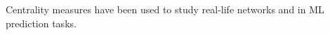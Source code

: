 \documentclass[preview]{standalone}
\begin{document}
Centrality measures have been used to study real-life networks and in ML prediction tasks.\\
\end{document}
